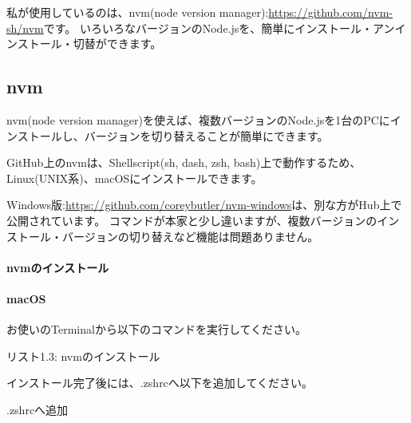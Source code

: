 \vspace*{\baselineskip}

私が使用しているのは、nvm(node version manager):\url{https://github.com/nvm-sh/nvm}です。
いろいろなバージョンのNode.jsを、簡単にインストール・アンインストール・切替ができます。

\subsection{nvm}
\keeplastskip{
  \label{sec:1-1-3}
  \par\nobreak
}

nvm(node version manager)を使えば、複数バージョンのNode.jsを1台のPCにインストールし、バージョンを切り替えることが簡単にできます。

\vspace*{\baselineskip}

GitHub上のnvmは、Shellscript(sh, dash, zsh, bash)上で動作するため、Linux(UNIX系)、macOSにインストールできます。

\vspace*{\baselineskip}

Windows版:\url{https://github.com/coreybutler/nvm-windows}は、別な方がHub上で公開されています。
コマンドが本家と少し違いますが、複数バージョンのインストール・バージョンの切り替えなど機能は問題ありません。

\paragraph*{nvmのインストール}
\paragraph*{macOS}
お使いのTerminalから以下のコマンドを実行してください。

\def\startercodeblockfontsize{}
\begin{starterterminal}[_622851268]{リスト1.3: nvmのインストール}\end{starterterminal}

インストール完了後には、.zshrcへ以下を追加してください。

\def\startercodeblockfontsize{}
\begin{starterterminal}[]{.zshrcへ追加}\end{starterterminal}
\ParagraphEnd

